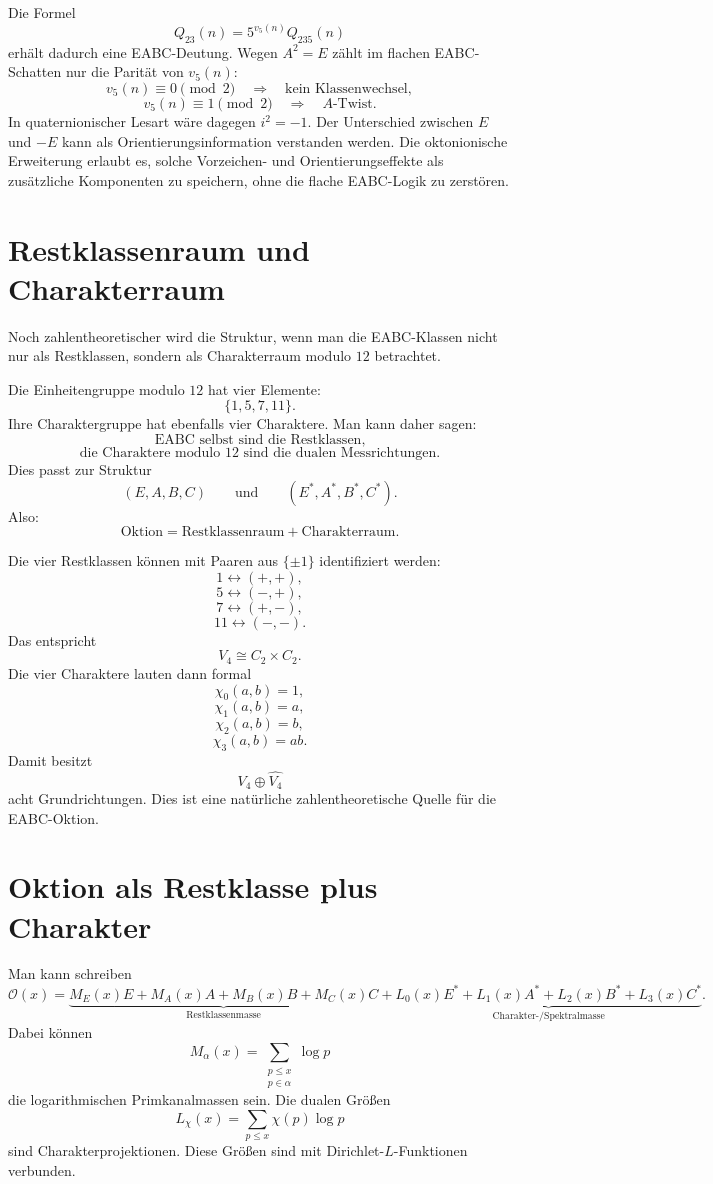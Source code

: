 \documentclass[11pt,a4paper]{article}
\theoremstyle{definition}
\theoremstyle{plain}
\begin{document}
	Die Formel
	\[
	Q_{23}(n)=5^{v_5(n)}Q_{235}(n)
	\]
	erhält dadurch eine EABC-Deutung. Wegen $A^2=E$ zählt im flachen EABC-Schatten nur die Parität von $v_5(n)$:
	\[
	v_5(n)\equiv 0\pmod 2
	\quad\Rightarrow\quad
	\text{kein Klassenwechsel},
	\]
	\[
	v_5(n)\equiv 1\pmod 2
	\quad\Rightarrow\quad
	A\text{-Twist}.
	\]
	In quaternionischer Lesart wäre dagegen $i^2=-1$. Der Unterschied zwischen $E$ und $-E$ kann als Orientierungsinformation verstanden werden. Die oktonionische Erweiterung erlaubt es, solche Vorzeichen- und Orientierungseffekte als zusätzliche Komponenten zu speichern, ohne die flache EABC-Logik zu zerstören.
	
	\section{Restklassenraum und Charakterraum}
	
	Noch zahlentheoretischer wird die Struktur, wenn man die EABC-Klassen nicht nur als Restklassen, sondern als Charakterraum modulo $12$ betrachtet.
	
	Die Einheitengruppe modulo $12$ hat vier Elemente:
	\[
	\{1,5,7,11\}.
	\]
	Ihre Charaktergruppe hat ebenfalls vier Charaktere. Man kann daher sagen:
	\[
	\text{EABC selbst sind die Restklassen,}
	\]
	\[
	\text{die Charaktere modulo }12\text{ sind die dualen Messrichtungen.}
	\]
	Dies passt zur Struktur
	\[
	(E,A,B,C)
	\qquad\text{und}\qquad
	(E^\ast,A^\ast,B^\ast,C^\ast).
	\]
	Also:
	\[
	\boxed{
		\text{Oktion}
		=
		\text{Restklassenraum}
		+
		\text{Charakterraum}
	}.
	\]
	
	Die vier Restklassen können mit Paaren aus $\{\pm1\}$ identifiziert werden:
	\[
	1\leftrightarrow(+,+),
	\]
	\[
	5\leftrightarrow(-,+),
	\]
	\[
	7\leftrightarrow(+,-),
	\]
	\[
	11\leftrightarrow(-,-).
	\]
	Das entspricht
	\[
	V_4\cong C_2\times C_2.
	\]
	Die vier Charaktere lauten dann formal
	\[
	\chi_0(a,b)=1,
	\]
	\[
	\chi_1(a,b)=a,
	\]
	\[
	\chi_2(a,b)=b,
	\]
	\[
	\chi_3(a,b)=ab.
	\]
	Damit besitzt
	\[
	V_4\oplus\widehat{V_4}
	\]
	acht Grundrichtungen. Dies ist eine natürliche zahlentheoretische Quelle für die EABC-Oktion.
	
	\section{Oktion als Restklasse plus Charakter}
	
	Man kann schreiben
	\[
	\mathcal O(x)
	=
	\underbrace{
		M_E(x)E+M_A(x)A+M_B(x)B+M_C(x)C
	}_{\text{Restklassenmasse}}
	+
	\underbrace{
		L_0(x)E^\ast+L_1(x)A^\ast+L_2(x)B^\ast+L_3(x)C^\ast
	}_{\text{Charakter-/Spektralmasse}}.
	\]
	Dabei können
	\[
	M_\alpha(x)=
	\sum_{\substack{p\le x\\p\in\alpha}}\log p
	\]
	die logarithmischen Primkanalmassen sein. Die dualen Größen
	\[
	L_\chi(x)=\sum_{p\le x}\chi(p)\log p
	\]
	sind Charakterprojektionen. Diese Größen sind mit Dirichlet-$L$-Funktionen verbunden.
	
\end{document}
